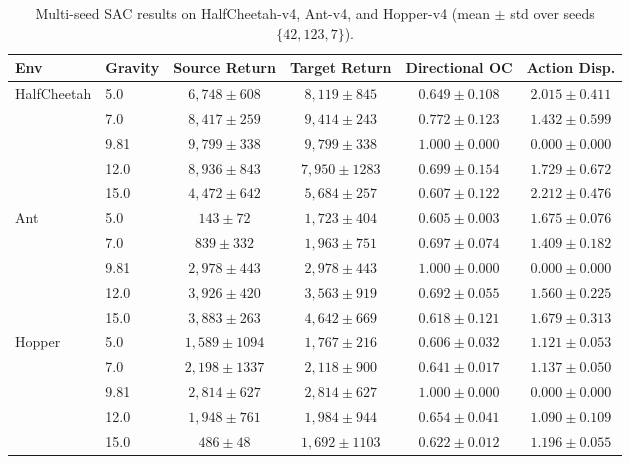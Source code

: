 \documentclass{article}
\begin{document}
\begin{table}[h]
\centering
\caption{Multi-seed SAC results on HalfCheetah-v4, Ant-v4, and Hopper-v4 (mean $\pm$ std over seeds $\{42,123,7\}$).}
\label{tab:multiseed}
\small
\begin{tabular}{llcccc}
\toprule
Env & Gravity & Source Return & Target Return & Directional OC & Action Disp. \\
\midrule
HalfCheetah & 5.0  & $6{,}748 \pm 608$  & $8{,}119 \pm 845$  & $0.649 \pm 0.108$ & $2.015 \pm 0.411$ \\
            & 7.0  & $8{,}417 \pm 259$  & $9{,}414 \pm 243$  & $0.772 \pm 0.123$ & $1.432 \pm 0.599$ \\
            & 9.81 & $9{,}799 \pm 338$  & $9{,}799 \pm 338$  & $1.000 \pm 0.000$ & $0.000 \pm 0.000$ \\
            & 12.0 & $8{,}936 \pm 843$  & $7{,}950 \pm 1283$ & $0.699 \pm 0.154$ & $1.729 \pm 0.672$ \\
            & 15.0 & $4{,}472 \pm 642$  & $5{,}684 \pm 257$  & $0.607 \pm 0.122$ & $2.212 \pm 0.476$ \\
\midrule
Ant         & 5.0  & $143 \pm 72$       & $1{,}723 \pm 404$  & $0.605 \pm 0.003$ & $1.675 \pm 0.076$ \\
            & 7.0  & $839 \pm 332$      & $1{,}963 \pm 751$  & $0.697 \pm 0.074$ & $1.409 \pm 0.182$ \\
            & 9.81 & $2{,}978 \pm 443$  & $2{,}978 \pm 443$  & $1.000 \pm 0.000$ & $0.000 \pm 0.000$ \\
            & 12.0 & $3{,}926 \pm 420$  & $3{,}563 \pm 919$  & $0.692 \pm 0.055$ & $1.560 \pm 0.225$ \\
            & 15.0 & $3{,}883 \pm 263$  & $4{,}642 \pm 669$  & $0.618 \pm 0.121$ & $1.679 \pm 0.313$ \\
\midrule
Hopper      & 5.0  & $1{,}589 \pm 1094$ & $1{,}767 \pm 216$  & $0.606 \pm 0.032$ & $1.121 \pm 0.053$ \\
            & 7.0  & $2{,}198 \pm 1337$ & $2{,}118 \pm 900$  & $0.641 \pm 0.017$ & $1.137 \pm 0.050$ \\
            & 9.81 & $2{,}814 \pm 627$  & $2{,}814 \pm 627$  & $1.000 \pm 0.000$ & $0.000 \pm 0.000$ \\
            & 12.0 & $1{,}948 \pm 761$  & $1{,}984 \pm 944$  & $0.654 \pm 0.041$ & $1.090 \pm 0.109$ \\
            & 15.0 & $486 \pm 48$       & $1{,}692 \pm 1103$ & $0.622 \pm 0.012$ & $1.196 \pm 0.055$ \\
\bottomrule
\end{tabular}
\end{table}
\end{document}
